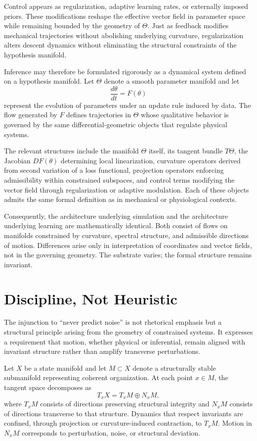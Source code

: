 \documentclass[12pt]{book}
\begin{document}
Control appears as regularization, adaptive learning rates, or externally imposed priors. These modifications reshape the effective vector field in parameter space while remaining bounded by the geometry of $\Theta$. Just as feedback modifies mechanical trajectories without abolishing underlying curvature, regularization alters descent dynamics without eliminating the structural constraints of the hypothesis manifold.

Inference may therefore be formulated rigorously as a dynamical system defined on a hypothesis manifold. Let $\Theta$ denote a smooth parameter manifold and let
\[
\frac{d\theta}{dt} = F(\theta)
\]
represent the evolution of parameters under an update rule induced by data. The flow generated by $F$ defines trajectories in $\Theta$ whose qualitative behavior is governed by the same differential-geometric objects that regulate physical systems.

The relevant structures include the manifold $\Theta$ itself, its tangent bundle $T\Theta$, the Jacobian $DF(\theta)$ determining local linearization, curvature operators derived from second variation of a loss functional, projection operators enforcing admissibility within constrained subspaces, and control terms modifying the vector field through regularization or adaptive modulation. Each of these objects admits the same formal definition as in mechanical or physiological contexts.

Consequently, the architecture underlying simulation and the architecture underlying learning are mathematically identical. Both consist of flows on manifolds constrained by curvature, spectral structure, and admissible directions of motion. Differences arise only in interpretation of coordinates and vector fields, not in the governing geometry. The substrate varies; the formal structure remains invariant.

\section{Discipline, Not Heuristic}

The injunction to ``never predict noise'' is not rhetorical emphasis but a structural principle arising from the geometry of constrained systems. It expresses a requirement that motion, whether physical or inferential, remain aligned with invariant structure rather than amplify transverse perturbations.

Let $X$ be a state manifold and let $M \subset X$ denote a structurally stable submanifold representing coherent organization. At each point $x \in M$, the tangent space decomposes as
\[
T_x X = T_x M \oplus N_x M,
\]
where $T_x M$ consists of directions preserving structural integrity and $N_x M$ consists of directions transverse to that structure. Dynamics that respect invariants are confined, through projection or curvature-induced contraction, to $T_x M$. Motion in $N_x M$ corresponds to perturbation, noise, or structural deviation.
\end{document}
